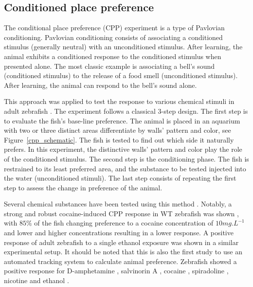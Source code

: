     \subsection{Conditioned place preference}
    The conditional place preference (CPP) experiment is a type of Pavlovian conditioning. Pavlovian conditioning consists of associating a conditioned stimulus (generally neutral) with an unconditioned stimulus. After learning, the animal exhibits a conditioned response to the conditioned stimulus when presented alone. The most classic example is associating a bell's sound (conditioned stimulus) to the release of a food smell (unconditioned stimulus). After learning, the animal can respond to the bell's sound alone.

    This approach was applied to test the response to various chemical stimuli in adult zebrafish \cite{mathur2011conditioned}. The experiment follows a classical 3-step design. The first step is to evaluate the fish's base-line preference. The animal is placed in an aquarium with two or three distinct areas differentiate by walls' pattern and color, see Figure~\ref{cpp_schematic}. The fish is tested to find out which side it naturally prefers. In this experiment, the distinctive walls' pattern and color play the role of the conditioned stimulus. The second step is the conditioning phase. The fish is restrained to its least preferred area, and the substance to be tested injected into the water (unconditioned stimuli). The last step consists of repeating the first step to assess the change in preference of the animal.

    Several chemical substances have been tested using this method \cite{blaser2014experiments,collier2013utility,tzschentke2007review}. Notably, a strong and robust cocaine-induced CPP response in WT zebrafish was shown \cite{darland2001behavioral}, with $85\%$ of the fish changing preference to a cocaine concentration of $10mg.L^{-1}$ and lower and higher concentrations resulting in a lower response. A positive response of adult zebrafish to a single ethanol exposure was shown \cite{mathur2011preference} in a similar experimental setup. It should be noted that this is also the first study to use an automated tracking system to calculate animal preference. Zebrafish showed a positive response for D-amphetamine \cite{ninkovic2006genetic, ninkovic2006zebrafish}, salvinorin A \cite{braida2007hallucinatory}, cocaine \cite{braida2007hallucinatory}, spiradoline \cite{braida2007hallucinatory}, nicotine \cite{kedikian2013behavioral} and ethanol \cite{kedikian2013behavioral}.

